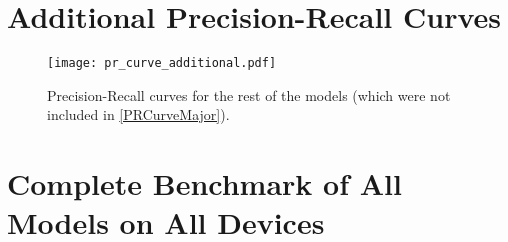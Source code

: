 \begin{appendices}


\chapter{Additional Precision-Recall Curves}
\label{PRCurvesAdditional}
\begin{figure}[H]
    \begin{framed}
        \centering
        \texttt{[image: pr\_curve\_additional.pdf]}
        \caption{Precision-Recall curves for the rest of the models (which were
        not included in \autoref{PRCurveMajor}).}
    \end{framed}
\end{figure}






\chapter{Complete Benchmark of All Models on All Devices}
\label{mAPvsFPS}



\end{appendices}
